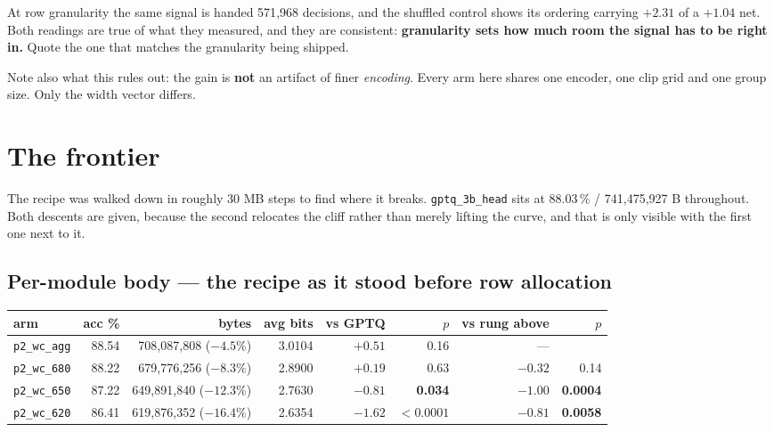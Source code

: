 \documentclass[11pt]{article}
\newcommand{\pct}{\,\%}
\newcommand{\code}[1]{\texttt{#1}}
\newcommand{\best}[1]{\textbf{#1}}
\begin{document}
At row granularity the same signal is handed 571{,}968 decisions, and the shuffled control shows
its ordering carrying $+2.31$ of a $+1.04$ net. Both readings are true of what they measured, and
they are consistent: \textbf{granularity sets how much room the signal has to be right in.} Quote
the one that matches the granularity being shipped.

Note also what this rules out: the gain is \textbf{not} an artifact of finer \emph{encoding}. Every
arm here shares one encoder, one clip grid and one group size. Only the width vector differs.

\section{The frontier}
\label{sec:frontier}

The recipe was walked down in roughly 30 MB steps to find where it breaks.
\code{gptq\_3b\_head} sits at 88.03\pct{} / 741{,}475{,}927 B throughout. Both descents are given,
because the second relocates the cliff rather than merely lifting the curve, and that is only
visible with the first one next to it.

\subsection{Per-module body --- the recipe as it stood before row allocation}

\begin{center}\small
\begin{tabular}{@{}lrrrrrrr@{}}
\toprule
arm & acc \% & bytes & avg bits & vs GPTQ & $p$ & vs rung above & $p$ \\
\midrule
\code{p2\_wc\_agg} & 88.54 & 708{,}087{,}808 ($-4.5\%$) & 3.0104 & $+0.51$ & 0.16 & --- & \\
\code{p2\_wc\_680} & 88.22 & 679{,}776{,}256 ($-8.3\%$) & 2.8900 & $+0.19$ & 0.63 & $-0.32$ & 0.14 \\
\code{p2\_wc\_650} & 87.22 & 649{,}891{,}840 ($-12.3\%$) & 2.7630 & \best{$-0.81$} & \best{0.034} & \best{$-1.00$} & \best{0.0004} \\
\code{p2\_wc\_620} & 86.41 & 619{,}876{,}352 ($-16.4\%$) & 2.6354 & \best{$-1.62$} & \best{$<0.0001$} & \best{$-0.81$} & \best{0.0058} \\
\bottomrule
\end{tabular}
\end{center}
\end{document}
